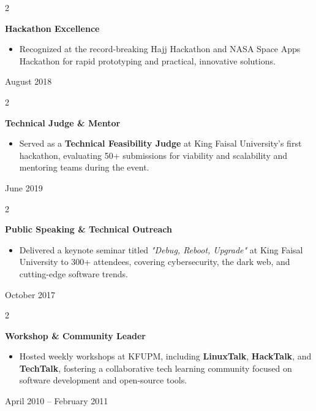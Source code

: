 \documentclass[10pt, letterpaper]{article}
\newenvironment{highlights}{
    \begin{itemize}[
        topsep=0.10 cm,
        parsep=0.10 cm,
        partopsep=0pt,
        itemsep=0pt,
        leftmargin=0.4 cm + 10pt
    ]
}{
    \end{itemize}
} %
\newenvironment{twocolentry}[2][]{
    \onecolentry
    \def\secondColumn{#2}
    \setcolumnwidth{\fill, 4.5 cm}
    \begin{paracol}{2}
}{
    \switchcolumn \raggedleft \secondColumn
    \end{paracol}
    \endonecolentry
} %
\begin{document}
    \begin{twocolentry}{
        August 2018
    }
        \textbf{Hackathon Excellence}
        \begin{highlights}
            \item Recognized at the record-breaking Hajj Hackathon and NASA Space Apps Hackathon for rapid prototyping and practical, innovative solutions.
        \end{highlights}
    \end{twocolentry}

    \begin{twocolentry}{
        June 2019
    }
        \textbf{Technical Judge \& Mentor}
        \begin{highlights}
            \item Served as a \textbf{Technical Feasibility Judge} at King Faisal University's first hackathon, evaluating 50+ submissions for viability and scalability and mentoring teams during the event.
        \end{highlights}
    \end{twocolentry}

    \begin{twocolentry}{
        October 2017
    }
        \textbf{Public Speaking \& Technical Outreach}
        \begin{highlights}
            \item Delivered a keynote seminar titled \textit{"Debug, Reboot, Upgrade"} at King Faisal University to 300+ attendees, covering cybersecurity, the dark web, and cutting-edge software trends.
        \end{highlights}
    \end{twocolentry}

    \begin{twocolentry}{
        April 2010 – February 2011
    }
        \textbf{Workshop \& Community Leader}
        \begin{highlights}
            \item Hosted weekly workshops at KFUPM, including \textbf{LinuxTalk}, \textbf{HackTalk}, and \textbf{TechTalk}, fostering a collaborative tech learning community focused on software development and open-source tools.
        \end{highlights}
    \end{twocolentry}
\end{document}
